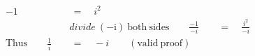 \begin{align*}
-1\quad&\,=\quad i^2\\
&divide\mathrm{~(-i)~both~sides}\qquad\frac{-1}{-i}\quad&\,=\quad\frac{i^2}{-i}\\
\mathrm{Thus}\qquad\frac{1}{i}\quad&\,=\quad-i\qquad\mathrm{(valid~proof)}
\end{align*}
